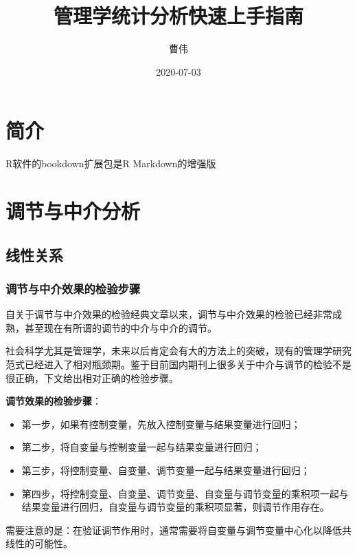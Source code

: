 \documentclass[
]{book}
\title{管理学统计分析快速上手指南}
\author{曹伟}
\date{2020-07-03}
\providecommand{\tightlist}{%
  \setlength{\itemsep}{0pt}\setlength{\parskip}{0pt}}
\begin{document}
\maketitle

{
\setcounter{tocdepth}{1}
\tableofcontents
}
\hypertarget{ux7b80ux4ecb}{%
\chapter*{简介}\label{ux7b80ux4ecb}}

R软件的bookdown扩展包是R Markdown的增强版

\hypertarget{mome}{%
\chapter{调节与中介分析}\label{mome}}

\hypertarget{linear}{%
\section{线性关系}\label{linear}}

\hypertarget{momesteps}{%
\subsection{调节与中介效果的检验步骤}\label{momesteps}}

自\autocite{Baron1986:RNG}关于调节与中介效果的检验经典文章以来，调节与中介效果的检验已经非常成熟，甚至现在有所谓的调节的中介与中介的调节。

社会科学尤其是管理学，未来以后肯定会有大的方法上的突破，现有的管理学研究范式已经进入了相对瓶颈期。鉴于目前国内期刊上很多关于中介与调节的检验不是很正确，下文给出相对正确的检验步骤。

\textbf{调节效果的检验步骤}：

\begin{itemize}
\tightlist
\item
  第一步，如果有控制变量，先放入控制变量与结果变量进行回归；
\item
  第二步，将自变量与控制变量一起与结果变量进行回归；
\item
  第三步，将控制变量、自变量、调节变量一起与结果变量进行回归；
\item
  第四步，将控制变量、自变量、调节变量、自变量与调节变量的乘积项一起与结果变量进行回归，自变量与调节变量的乘积项显著，则调节作用存在。
\end{itemize}

需要注意的是：在验证调节作用时，通常需要将自变量与调节变量中心化以降低共线性的可能性。
\end{document}
